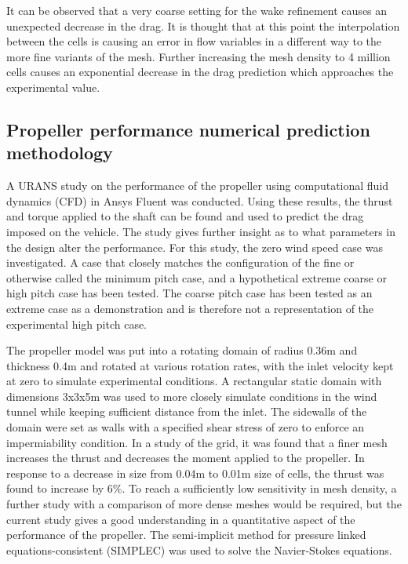 It can be observed that a very coarse setting for the wake refinement causes an unexpected decrease in the drag. It is thought that at this point the interpolation between the cells is causing an error in flow variables in a different way to the more fine variants of the mesh. Further increasing the mesh density to 4 million cells causes an exponential decrease in the drag prediction which approaches the experimental value.



\subsection{Propeller performance numerical prediction methodology}

A URANS study on the performance of the propeller using computational fluid dynamics (CFD) in Ansys Fluent was conducted. Using these results, the thrust and torque applied to the shaft can be found and used to predict the drag imposed on the vehicle. The study gives further insight as to what parameters in the design alter the performance. For this study, the zero wind speed case was investigated. A case that closely matches the configuration of the fine or otherwise called the minimum pitch case, and a hypothetical extreme coarse or high pitch case has been tested. The coarse pitch case has been tested as an extreme case as a demonstration and is therefore not a representation of the experimental high pitch case.  

The propeller model was put into a rotating domain of radius 0.36m and thickness 0.4m and rotated at various rotation rates, with the inlet velocity kept at zero to simulate experimental conditions. A rectangular static domain with dimensions 3x3x5m was used to more closely simulate conditions in the wind tunnel while keeping sufficient distance from the inlet. The sidewalls of the domain were set as walls with a specified shear stress of zero to enforce an impermiability condition. In a study of the grid, it was found that a finer mesh increases the thrust and decreases the moment applied to the propeller. In response to a decrease in size from 0.04m to 0.01m size of cells, the thrust was found to increase by 6\%. To reach a sufficiently low sensitivity in mesh density, a further study with a comparison of more dense meshes would be required, but the current study gives a good understanding in a quantitative aspect of the performance of the propeller. The semi-implicit method for pressure linked equations-consistent (SIMPLEC) was used to solve the Navier-Stokes equations.

